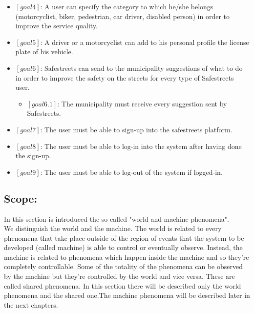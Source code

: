 \documentclass[titlepage]{article}
\begin{document}
\begin{itemize}
\item $[goal 4]$: A user can specify the category to which 						  he/she belongs (motorcyclist, biker, 							  pedestrian, car driver, disabled person) in 				  order to improve the service quality.\\

\item $[goal 5]$: A driver or a motorcyclist can add to his 					  personal profile the license plate of his 					  vehicle.\\

\item $[goal 6]$: Safestreets can send to the municipality 						  suggestions of what to do in order to 						  improve the safety on the streets for every 
				  type of Safestreets user.
	\begin{itemize}
	\item $[goal 6.1]$: The municipality must receive every 
					    suggestion sent by Safestreets.\\
					   
	
	\end{itemize}
\item $[goal 7]$: The user must be able to sign-up into the safestreets platform.
\item $[goal 8]$: The user must be able to log-in into the system after having done the sign-up.
\item $[goal 9]$: The user must be able to log-out of the system if logged-in.
\end{itemize}

\subsection{Scope:}
In this section is introduced the so called "world and machine phenomena".\\
We distinguish the world and the machine. The world is related to every phenomena that take place outside of the region of events that the system to be developed (called machine) is able to control or eventually observe. Instead, the machine is related to phenomena which happen inside the machine and so they're completely controllable. Some of the totality of the phenomena can be observed by the machine but they're controlled by the world and vice versa. These are called shared phenomena. In this section there will be described only the world phenomena and the shared one.The machine phenomena will be described later in the next chapters.
\end{document}
